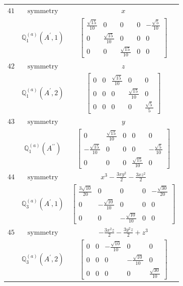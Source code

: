 \documentclass[fleqn,8pt,landscape]{jsarticle}
\begin{document}
\begin{longtable}{ccc}
$ 41 $ & $ \text{symmetry} $ & $ x $ \\
$  $ & $ \mathbb{Q}_{1}^{(a)}(A^{\prime},1) $ & $ \begin{bmatrix} \frac{\sqrt{15}}{10} & 0 & 0 & 0 & - \frac{\sqrt{5}}{10} \\ 0 & \frac{\sqrt{15}}{10} & 0 & 0 & 0 \\ 0 & 0 & \frac{\sqrt{15}}{10} & 0 & 0 \end{bmatrix} $ \\ \hline
$ 42 $ & $ \text{symmetry} $ & $ z $ \\
$  $ & $ \mathbb{Q}_{1}^{(a)}(A^{\prime},2) $ & $ \begin{bmatrix} 0 & 0 & \frac{\sqrt{15}}{10} & 0 & 0 \\ 0 & 0 & 0 & \frac{\sqrt{15}}{10} & 0 \\ 0 & 0 & 0 & 0 & \frac{\sqrt{5}}{5} \end{bmatrix} $ \\ \hline
$ 43 $ & $ \text{symmetry} $ & $ y $ \\
$  $ & $ \mathbb{Q}_{1}^{(a)}(A^{\prime\prime}) $ & $ \begin{bmatrix} 0 & \frac{\sqrt{15}}{10} & 0 & 0 & 0 \\ - \frac{\sqrt{15}}{10} & 0 & 0 & 0 & - \frac{\sqrt{5}}{10} \\ 0 & 0 & 0 & \frac{\sqrt{15}}{10} & 0 \end{bmatrix} $ \\ \hline
$ 44 $ & $ \text{symmetry} $ & $ x^{3} - \frac{3 x y^{2}}{2} - \frac{3 x z^{2}}{2} $ \\
$  $ & $ \mathbb{Q}_{3}^{(a)}(A^{\prime},1) $ & $ \begin{bmatrix} \frac{3 \sqrt{10}}{20} & 0 & 0 & 0 & - \frac{\sqrt{30}}{20} \\ 0 & - \frac{\sqrt{10}}{10} & 0 & 0 & 0 \\ 0 & 0 & - \frac{\sqrt{10}}{10} & 0 & 0 \end{bmatrix} $ \\ \hline
$ 45 $ & $ \text{symmetry} $ & $ - \frac{3 x^{2} z}{2} - \frac{3 y^{2} z}{2} + z^{3} $ \\
$  $ & $ \mathbb{Q}_{3}^{(a)}(A^{\prime},2) $ & $ \begin{bmatrix} 0 & 0 & - \frac{\sqrt{10}}{10} & 0 & 0 \\ 0 & 0 & 0 & - \frac{\sqrt{10}}{10} & 0 \\ 0 & 0 & 0 & 0 & \frac{\sqrt{30}}{10} \end{bmatrix} $ \\ \hline

\end{longtable}
\end{document}
